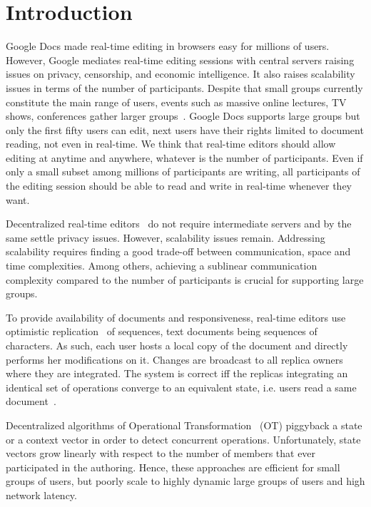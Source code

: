 

\section{Introduction}

Google Docs made real-time editing in browsers easy for millions of
users. However, Google mediates real-time editing sessions with central servers
raising issues on privacy, censorship, and economic intelligence. It also raises
scalability issues in terms of the number of participants.  Despite that small
groups currently constitute the main range of users, events such as massive
online lectures, TV shows, conferences gather larger
groups~\cite{breslow2013studying}.  Google Docs supports large groups but only
the first fifty users can edit, next users have their rights limited to document
reading, not even in real-time.  We think that real-time editors should allow
editing at anytime and anywhere, whatever is the number of participants. Even if
only a small subset among millions of participants are writing, all participants
of the editing session should be able to read and write in real-time whenever
they want.

Decentralized real-time editors~\cite{oster2006data, sun1998operational,
  sun2009contextbased} do not require intermediate servers and by the same
settle privacy issues. However, scalability issues remain.  Addressing
scalability requires finding a good trade-off between communication, space and
time complexities. Among others, achieving a sublinear communication complexity
compared to the number of participants is crucial for supporting large groups.

To provide availability of documents and responsiveness, real-time editors use
optimistic replication~\cite{saito2005optimistic} of sequences, text documents
being sequences of characters. As such, each user hosts a local copy of the
document and directly performs her modifications on it. Changes are broadcast to
all replica owners where they are integrated. The system is correct iff the
replicas integrating an identical set of operations converge to an equivalent
state, i.e. users read a same document~\cite{shapiro2011conflict}.

Decentralized algorithms of Operational
Transformation~\cite{sun2009contextbased} (OT) piggyback a state or a context
vector in order to detect concurrent operations. Unfortunately, state vectors
grow linearly with respect to the number of members that ever participated in
the authoring. Hence, these approaches are efficient for small groups of users,
but poorly scale to highly dynamic large groups of users and high network
latency.

